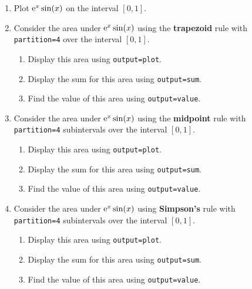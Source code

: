 \begin{enumerate}
    \item   Plot ${\rm e}^x\sin(x)$ on the interval $[0,1]$.
    \item   Consider the area under ${\rm e}^x\sin(x)$ using the \textbf{trapezoid} rule with \\ \texttt{partition=4} over the interval $[0,1]$.
    \begin{enumerate}
    	\item Display this area using \texttt{output=plot}.
    	\item Display the sum for this area using \texttt{output=sum}.
    	\item Find the value of this area using \texttt{output=value}.
    \end{enumerate}
    \item   Consider the area under ${\rm e}^x\sin(x)$ using the \textbf{midpoint} rule with \\ \texttt{partition=4} subintervals over the interval $[0,1]$.
    \begin{enumerate}
    	\item Display this area using \texttt{output=plot}.
    	\item Display the sum for this area using \texttt{output=sum}.
    	\item Find the value of this area using \texttt{output=value}.
    \end{enumerate}
    \item   Consider the area under ${\rm e}^x\sin(x)$ using \textbf{Simpson's} rule with \\ \texttt{partition=4} subintervals over the interval $[0,1]$.
    \begin{enumerate}
    	\item Display this area using \texttt{output=plot}.
    	\item Display the sum for this area using \texttt{output=sum}.
    	\item Find the value of this area using \texttt{output=value}.
    \end{enumerate}

\end{enumerate}
